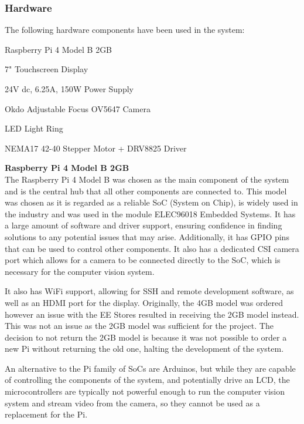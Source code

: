 \subsubsection{Hardware} \label{sec:hardware}
The following hardware components have been used in the system:
\begin{mylist}
  \item Raspberry Pi 4 Model B 2GB\cite{pi4}
  \item 7" Touchscreen Display\cite{7inchdisplay}
  \item 24V dc, 6.25A, 150W Power Supply
  \item Okdo Adjustable Focus OV5647 Camera\cite{okdocamera}
  \item LED Light Ring
  \item NEMA17 42-40 Stepper Motor + DRV8825 Driver
\end{mylist}
\textbf{Raspberry Pi 4 Model B 2GB} \\
The Raspberry Pi 4 Model B was chosen as the main component of the system and is the central hub that all other components are connected to.
This model was chosen as it is regarded as a reliable SoC (System on Chip), is widely used in the industry and was used in the module ELEC96018 Embedded Systems.
It has a large amount of software and driver support, ensuring confidence in finding solutions to any potential issues that may arise. Additionally, 
it has GPIO pins that can be used to control other components. It also has a 
dedicated CSI camera port which allows for a camera to be connected directly to the SoC, which is necessary for the computer vision system.

It also has WiFi support, allowing for SSH and remote development software, as well as an HDMI port for the display.
Originally, the 4GB model was ordered however an issue with the EE Stores resulted in receiving the 2GB model instead.
This was not an issue as the 2GB model was sufficient for the project. The decision to not return the 2GB model is because it was not 
possible to order a new Pi without returning the old one, halting the development of the system.

An alternative to the Pi family of SoCs are Arduinos, but while they are capable of controlling the components of the system,
and potentially drive an LCD, the microcontrollers are typically not powerful enough to run the computer vision system and stream video from the camera,
so they cannot be used as a replacement for the Pi.

